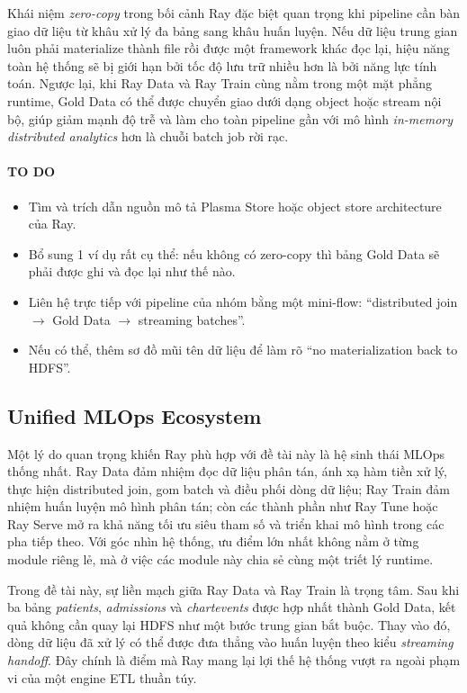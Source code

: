 Khái niệm \textit{zero-copy} trong bối cảnh Ray đặc biệt quan trọng khi pipeline cần bàn giao dữ liệu từ khâu xử lý đa bảng sang khâu huấn luyện. Nếu dữ liệu trung gian luôn phải materialize thành file rồi được một framework khác đọc lại, hiệu năng toàn hệ thống sẽ bị giới hạn bởi tốc độ lưu trữ nhiều hơn là bởi năng lực tính toán. Ngược lại, khi Ray Data và Ray Train cùng nằm trong một mặt phẳng runtime, Gold Data có thể được chuyển giao dưới dạng object hoặc stream nội bộ, giúp giảm mạnh độ trễ và làm cho toàn pipeline gần với mô hình \textit{in-memory distributed analytics} hơn là chuỗi batch job rời rạc.

\paragraph{TO DO}
\begin{itemize}
    \item Tìm và trích dẫn nguồn mô tả Plasma Store hoặc object store architecture của Ray.
    \item Bổ sung 1 ví dụ rất cụ thể: nếu không có zero-copy thì bảng Gold Data sẽ phải được ghi và đọc lại như thế nào.
    \item Liên hệ trực tiếp với pipeline của nhóm bằng một mini-flow: ``distributed join $\rightarrow$ Gold Data $\rightarrow$ streaming batches''. 
    \item Nếu có thể, thêm sơ đồ mũi tên dữ liệu để làm rõ ``no materialization back to HDFS''.
\end{itemize}

\subsection{Unified MLOps Ecosystem}
Một lý do quan trọng khiến Ray phù hợp với đề tài này là hệ sinh thái MLOps thống nhất. Ray Data đảm nhiệm đọc dữ liệu phân tán, ánh xạ hàm tiền xử lý, thực hiện distributed join, gom batch và điều phối dòng dữ liệu; Ray Train đảm nhiệm huấn luyện mô hình phân tán; còn các thành phần như Ray Tune hoặc Ray Serve mở ra khả năng tối ưu siêu tham số và triển khai mô hình trong các pha tiếp theo. Với góc nhìn hệ thống, ưu điểm lớn nhất không nằm ở từng module riêng lẻ, mà ở việc các module này chia sẻ cùng một triết lý runtime.

Trong đề tài này, sự liền mạch giữa Ray Data và Ray Train là trọng tâm. Sau khi ba bảng \textit{patients}, \textit{admissions} và \textit{chartevents} được hợp nhất thành Gold Data, kết quả không cần quay lại HDFS như một bước trung gian bắt buộc. Thay vào đó, dòng dữ liệu đã xử lý có thể được đưa thẳng vào huấn luyện theo kiểu \textit{streaming handoff}. Đây chính là điểm mà Ray mang lại lợi thế hệ thống vượt ra ngoài phạm vi của một engine ETL thuần túy.

